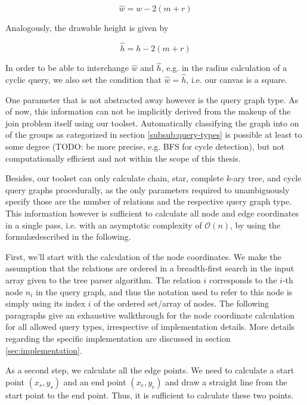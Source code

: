 \begin{equation}\label{eqn:painting-w_hat}
    \hat{w} = w - 2(m + r)
\end{equation}

Analogously, the drawable height is given by

\begin{equation}\label{eqn:painting-h_hat}
    \hat{h} = h - 2(m + r)    
\end{equation}

In order to be able to interchange $\hat{w}$ and $\hat{h}$, e.g. in the radius calculation of a cyclic query, we also set the condition that $\hat{w} = \hat{h}$, i.e. our canvas is a square.

One parameter that is not abstracted away however is the query graph type. As of now, this information can not be implicitly derived from the makeup of the join problem itself using our toolset. Automatically classifying the graph into on of the groups as categorized in section \ref{subsub:query-types} is possible at least to some degree (TODO: be more precise, e.g. BFS for cycle detection), but not computationally efficient and not within the scope of this thesis.

Besides, our toolset can only calculate chain, star, complete $k$-ary tree, and cycle query graphs procedurally, as the only parameters required to unambiguously specify those are the number of relations and the respective query graph type. This information however is sufficient to calculate all node and edge coordinates in a single pass, i.e. with an asymptotic complexity of $\mathcal{O}(n)$, by using the formul\ae described in the following.


First, we'll start with the calculation of the node coordinates. We make the assumption that the relations are ordered in a breadth-first search in the input array given to the tree parser algorithm. The relation $i$ corresponds to the $i$-th node $n_i$ in the query graph, and thus the notation used to refer to this node is simply using its index $i$ of the ordered set/array of nodes. The following paragraphs give an exhaustive walkthrough for the node coordinate calculation for all allowed query types, irrespective of implementation details. More details regarding the specific implementation are discussed in section \ref{sec:implementation}.

As a second step, we calculate all the edge points. We need to calculate a start point $(x_s, y_s)$ and an end point $(x_e, y_e)$ and draw a straight line from the start point to the end point. Thus, it is sufficient to calculate these two points.

